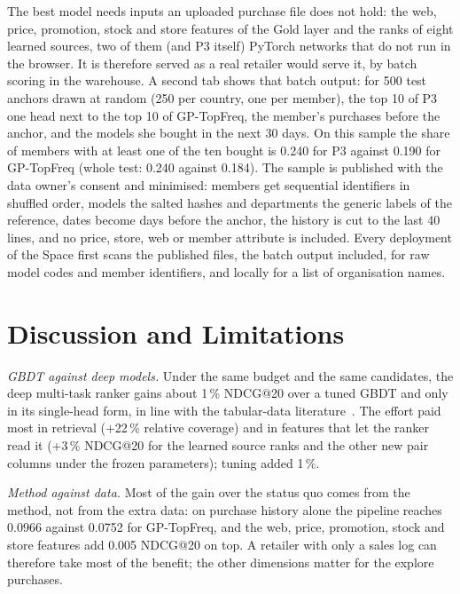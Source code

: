 \documentclass{ieeeaccess}
\begin{document}
The best model needs inputs an uploaded purchase file does not hold: the web, price, promotion, stock and store features of the
Gold layer and the ranks of eight learned sources, two of them (and P3 itself) PyTorch networks that do not run in the browser. It
is therefore served as a real retailer would serve it, by batch scoring in the warehouse. A second tab shows that batch output:
for 500 test anchors drawn at random (250 per country, one per member), the top 10 of P3 one head next to the top 10 of
GP-TopFreq, the member's purchases before the anchor, and the models she bought in the next 30 days. On this sample the share of
members with at least one of the ten bought is 0.240 for P3 against 0.190 for GP-TopFreq (whole test: 0.240 against 0.184). The
sample is published with the data owner's consent and minimised: members get sequential identifiers in shuffled order, models
the salted hashes and departments the generic labels of the reference, dates become days before the anchor, the history is cut to
the last 40 lines, and no price, store, web or member attribute is included. Every deployment of the Space first scans the published files, the batch output included, for
raw model codes and member identifiers, and locally for a list of organisation names.

\section{Discussion and Limitations}
\label{sec:discussion}

\textit{GBDT against deep models.} Under the same budget and the same candidates, the deep multi-task ranker gains about 1\,\% NDCG@20
over a tuned GBDT and only in its single-head form, in line with the tabular-data literature~\cite{grinsztajn2022tabular}. The effort paid
most in retrieval (+22\,\% relative coverage) and in features that let the ranker read it (+3\,\% NDCG@20 for the learned source ranks
and the other new pair columns under the frozen parameters); tuning added 1\,\%.

\textit{Method against data.} Most of the gain over the status quo comes from the method, not from the extra data: on purchase history
alone the pipeline reaches 0.0966 against 0.0752 for GP-TopFreq, and the web, price, promotion, stock and store features add 0.005
NDCG@20 on top. A retailer with only a sales log can therefore take most of the benefit; the other dimensions matter for the
explore purchases.
\end{document}
